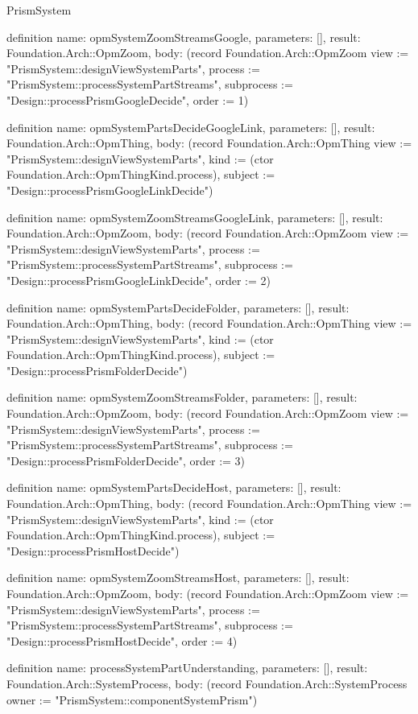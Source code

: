 \begin{lexlean}{PrismSystem}
\begin{semanticmodule}
definition{
  name: opmSystemZoomStreamsGoogle,
  parameters: [],
  result: Foundation.Arch::OpmZoom,
  body: (record Foundation.Arch::OpmZoom {view := "PrismSystem::designViewSystemParts", process := "PrismSystem::processSystemPartStreams", subprocess := "Design::processPrismGoogleDecide", order := 1})
}

definition{
  name: opmSystemPartsDecideGoogleLink,
  parameters: [],
  result: Foundation.Arch::OpmThing,
  body: (record Foundation.Arch::OpmThing {view := "PrismSystem::designViewSystemParts", kind := (ctor Foundation.Arch::OpmThingKind.process), subject := "Design::processPrismGoogleLinkDecide"})
}

definition{
  name: opmSystemZoomStreamsGoogleLink,
  parameters: [],
  result: Foundation.Arch::OpmZoom,
  body: (record Foundation.Arch::OpmZoom {view := "PrismSystem::designViewSystemParts", process := "PrismSystem::processSystemPartStreams", subprocess := "Design::processPrismGoogleLinkDecide", order := 2})
}

definition{
  name: opmSystemPartsDecideFolder,
  parameters: [],
  result: Foundation.Arch::OpmThing,
  body: (record Foundation.Arch::OpmThing {view := "PrismSystem::designViewSystemParts", kind := (ctor Foundation.Arch::OpmThingKind.process), subject := "Design::processPrismFolderDecide"})
}

definition{
  name: opmSystemZoomStreamsFolder,
  parameters: [],
  result: Foundation.Arch::OpmZoom,
  body: (record Foundation.Arch::OpmZoom {view := "PrismSystem::designViewSystemParts", process := "PrismSystem::processSystemPartStreams", subprocess := "Design::processPrismFolderDecide", order := 3})
}

definition{
  name: opmSystemPartsDecideHost,
  parameters: [],
  result: Foundation.Arch::OpmThing,
  body: (record Foundation.Arch::OpmThing {view := "PrismSystem::designViewSystemParts", kind := (ctor Foundation.Arch::OpmThingKind.process), subject := "Design::processPrismHostDecide"})
}

definition{
  name: opmSystemZoomStreamsHost,
  parameters: [],
  result: Foundation.Arch::OpmZoom,
  body: (record Foundation.Arch::OpmZoom {view := "PrismSystem::designViewSystemParts", process := "PrismSystem::processSystemPartStreams", subprocess := "Design::processPrismHostDecide", order := 4})
}

definition{
  name: processSystemPartUnderstanding,
  parameters: [],
  result: Foundation.Arch::SystemProcess,
  body: (record Foundation.Arch::SystemProcess {owner := "PrismSystem::componentSystemPrism"})
}


\end{semanticmodule}
\end{lexlean}

